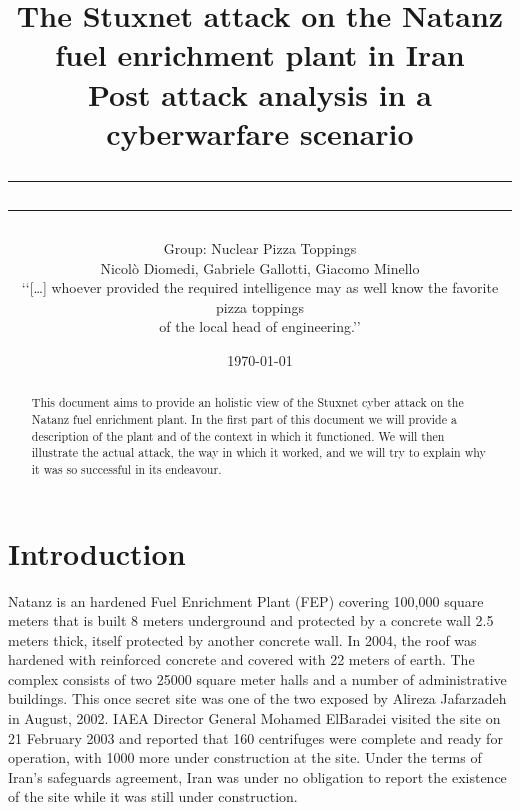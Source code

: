 \documentclass[12pt]{article}
\title{The Stuxnet attack on the Natanz fuel enrichment plant in Iran\\
\large{Post attack analysis in a cyberwarfare scenario}
\rule[0.1cm]{13cm}{0.1mm}
\rule[0.5cm]{13.5cm}{0.6mm}}
\author{Group: Nuclear Pizza Toppings \\
Nicolò Diomedi, Gabriele Gallotti, Giacomo Minello
\\
\scriptsize‘‘[…] whoever provided the required intelligence may as well know the favorite pizza toppings \\
\scriptsize of the local head of engineering.’’\cite{killcentrifuge}
\\
}
\date{\today}
\date{}
\begin{document}
\begin{titlepage}
\maketitle
\begin{abstract}
\noindent  This document aims to provide an holistic view of the Stuxnet cyber attack on the Natanz fuel enrichment plant.
In the first part of this document we will provide a description of the plant and of the context in which it functioned. 
We will then illustrate the actual attack, the way in which it worked, and we will try to explain why it was so successful in its endeavour.
\end{abstract}
\end{titlepage}


\tableofcontents

\listoffigures

\newpage

\section{Introduction}
Natanz is an hardened Fuel Enrichment Plant (FEP) covering 100,000 square meters that is built 8 meters underground and protected by a concrete wall 2.5 meters thick, itself protected by another concrete wall. In 2004, the roof was hardened with reinforced concrete and covered with 22 meters of earth. The complex consists of two 25000 square meter halls and a number of administrative buildings. This once secret site was one of the two exposed by Alireza Jafarzadeh in August, 2002. IAEA Director General Mohamed ElBaradei visited the site on 21 February 2003 and reported that 160 centrifuges were complete and ready for operation, with 1000 more under construction at the site. Under the terms of Iran’s safeguards agreement, Iran was under no obligation to report the existence of the site while it was still under construction.
\end{document}
